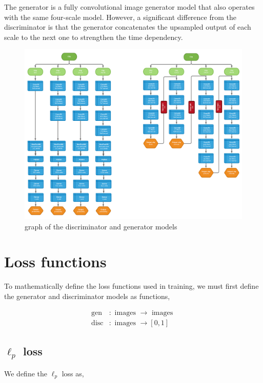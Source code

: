 \documentclass{article}
\begin{document}
The generator is a fully convolutional image generator model that also operates with the same four-scale model. However, a significant difference from the discriminator is that the generator concatenates the upsampled output of each scale to the next one to strengthen the time dependency.

\begin{figure}[H]
    \caption{graph of the discriminator and generator models}
    \centering
    \includegraphics[width=1.0\linewidth]{disc-gen-graph.png}
\end{figure}

\clearpage

\section{Loss functions}

To mathematically define the loss functions used in training, we must first define the generator and discriminator models as functions,

\begin{align*}
    \mathrm{gen} &: \textrm{ images } \to \textrm{ images }\\
    \mathrm{disc} &: \textrm{ images } \to [0, 1]
\end{align*}

\subsection{$\ell_p$ loss}

We define the $\ell_p$ loss as,
\end{document}
